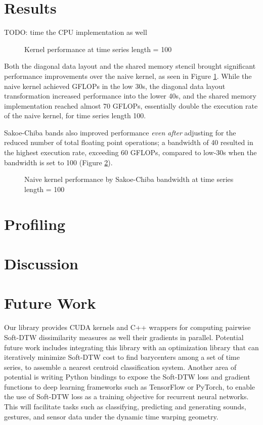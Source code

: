 \documentclass[12pt, letterpaper]{article}
\begin{document}
\section{Results}
\FloatBarrier
TODO: time the CPU implementation as well

\begin{figure}[htbp]
    \begin{center}
        
    \end{center}
    \caption{Kernel performance at time series length = 100}
    \label{plot_multi}
\end{figure}

Both the diagonal data layout and the shared memory stencil brought significant
performance improvements over the naive kernel, as seen in Figure
\ref{plot_multi}. While the naive kernel achieved GFLOPs in the low 30s, the
diagonal data layout transformation increased performance into the lower 40s,
and the shared memory implementation reached almost 70 GFLOPs, essentially
double the execution rate of the naive kernel, for time series length 100.

Sakoe-Chiba bands also improved performance \emph{even after} adjusting for the
reduced number of total floating point operations; a bandwidth of 40 resulted in
the highest execution rate, exceeding 60 GFLOPs, compared to low-30s when the
bandwidth is set to 100 (Figure \ref{plot_bw}).

\begin{figure}[htbp]
    \begin{center}
        
    \end{center}
    \caption{Naive kernel performance by Sakoe-Chiba bandwidth at time series
      length = 100}
    \label{plot_bw}
\end{figure}
\FloatBarrier
\section{Profiling}

\section{Discussion}

\section{Future Work}

Our library provides CUDA kernels and C++ wrappers for computing pairwise
Soft-DTW dissimilarity measures as well their gradients in parallel. Potential
future work includes integrating this library with an optimization library that
can iteratively minimize Soft-DTW cost to find barycenters among a set of time
series, to assemble a nearest centroid classification system. Another area of
potential is writing Python bindings to expose the Soft-DTW loss and gradient
functions to deep learning frameworks such as TensorFlow or PyTorch, to enable
the use of Soft-DTW loss as a training objective for recurrent neural networks.
This will facilitate tasks such as classifying, predicting and generating sounds,
gestures, and sensor data under the dynamic time warping geometry.

\printbibliography[]
\end{document}
